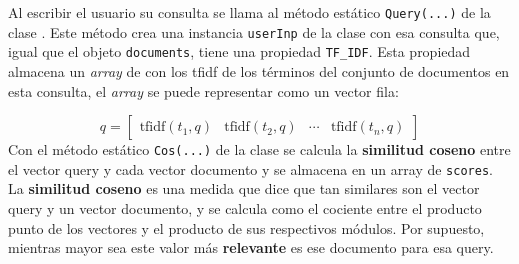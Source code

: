 \documentclass{beamer}
\begin{document}
\begin{frame}
Al escribir el usuario su consulta se llama al método estático \texttt{Query(...)} de la clase . Este método crea una instancia \texttt{userInp} de la clase  con esa consulta que, igual que el objeto \texttt{documents}, tiene una propiedad \texttt{TF\_IDF}. Esta propiedad almacena un \textit{array} de  con los tfidf de los términos del conjunto de documentos en esta consulta, el \textit{array} se puede representar como un vector fila:

\begin{equation*}
q = \begin{bmatrix}
\text{tfidf}(t_1, q) & \text{tfidf}(t_2, q)& \cdots & \text{tfidf}(t_n, q)
\end{bmatrix}
\end{equation*}
Con el método estático \texttt{Cos(...)} de la clase  se calcula la \textbf{similitud coseno} entre el vector query y cada vector documento y se almacena en un array de  \texttt{scores}. La \textbf{similitud coseno} es una medida que dice que tan similares son el vector query y un vector documento, y se calcula como el cociente entre el producto punto de los vectores y el producto de sus respectivos módulos. Por supuesto, mientras mayor sea este valor más \textbf{relevante} es ese documento para esa query. 

\end{frame}
\end{document}
